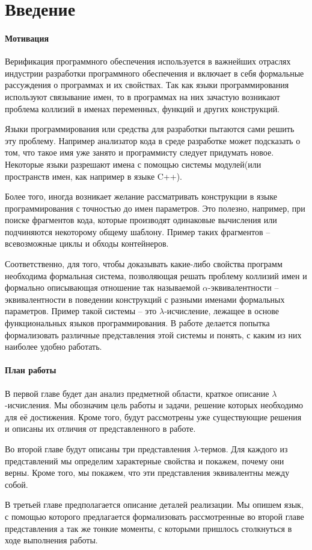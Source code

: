 \section*{Введение}

\paragraph{Мотивация}
Верификация программного обеспечения используется в важнейших отраслях индустрии разработки программного обеспечения и включает в себя формальные рассуждения о программах и их свойствах. Так как языки программирования используют связывание имен, то в программах на них зачастую возникают проблема коллизий в именах переменных, функций и других конструкций.

Языки программирования или средства для разработки пытаются сами решить эту проблему. Например анализатор кода в среде разработке может подсказать о том, что такое имя уже занято и программисту следует придумать новое. Некоторые языки разрешают имена с помощью системы модулей(или пространств имен, как например в языке C++).

Более того, иногда возникает желание рассматривать конструкции в языке программирования с точностью до имен параметров. Это полезно, например, при поиске фрагментов кода, которые производят одинаковые вычисления или подчиняются некоторому общему шаблону. Пример таких фрагментов -- всевозможные циклы и обходы контейнеров.

Соответственно, для того, чтобы доказывать какие-либо свойства программ необходима формальная система, позволяющая решать проблему коллизий имен и формально описывающая отношение так называемой $\alpha$-эквивалентности -- эквивалентности в поведении конструкций с разными именами формальных параметров. Пример такой системы -- это $\lambda$-исчисление, лежащее в основе функциональных языков программирования. В работе делается попытка формализовать различные представления этой системы и понять, с каким из них наиболее удобно работать.

\paragraph{План работы}
В первой главе будет дан анализ предметной области, краткое описание $\lambda$-исчисления. Мы обозначим цель работы и задачи, решение которых необходимо для её достижения. Кроме того, будут рассмотрены уже существующие решения и описаны их отличия от представленного в работе.

Во второй главе будут описаны три представления $\lambda$-термов. Для каждого из представлений мы определим характерные свойства и покажем, почему они верны. Кроме того, мы покажем, что эти представления эквивалентны между собой.

В третьей главе предполагается описание деталей реализации. Мы опишем язык, с помощью которого предлагается формализовать рассмотренные во второй главе представления а так же тонкие моменты, с которыми пришлось столкнуться в ходе выполнения работы.
